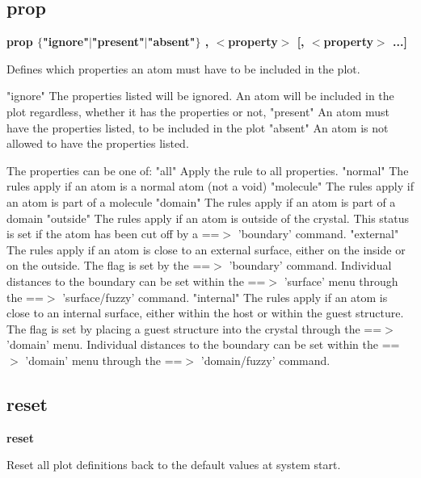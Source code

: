 \subsection*{prop}
{\bf prop $ \{$"ignore"$| $"present"$| $"absent"$\} $ , $ <$property$> $ [, $ <$property$> $ ...] \par }
\par
\vspace{3pt}
Defines which properties an atom must have to be included in the plot. 
\par
"ignore" 
The properties listed will be ignored. An atom will be included in 
the plot regardless, whether it has the properties or not, 
"present" 
An atom must have the properties listed, to be included in the plot 
"absent" 
An atom is not allowed to have the properties listed. 
\par
The properties can be one of: 
"all" 
Apply the rule to all properties. 
"normal" 
The rules apply if an atom is a normal atom (not a void) 
"molecule" 
The rules apply if an atom is part of a molecule 
"domain" 
The rules apply if an atom is part of a domain 
"outside" 
The rules apply if an atom is outside of the crystal. This status 
is set if the atom has been cut off by a ==$> $ 'boundary' command. 
"external" 
The rules apply if an atom is close to an external surface, either 
on the inside or on the outside. 
The flag is set by the ==$> $ 'boundary' command. Individual distances 
to the boundary can be set within the ==$> $ 'surface' menu through 
the ==$> $ 'surface/fuzzy' command. 
"internal" 
The rules apply if an atom is close to an internal surface, either 
within the host or within the guest structure. 
The flag is set by placing a guest structure into the crystal through 
the ==$> $ 'domain' menu. Individual distances 
to the boundary can be set within the ==$> $ 'domain' menu through 
the ==$> $ 'domain/fuzzy' command. 
\subsection*{reset}
{\bf reset \par }
\par
\vspace{3pt}
Reset all plot definitions back to the default values at 
system start. 
